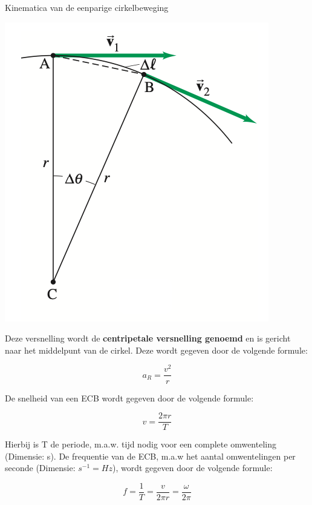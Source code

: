 \begin{theo}{Kinematica van de eenparige cirkelbeweging}
\begin{minipage}{.55\textwidth}
        
    \end{minipage} 
    \begin{minipage}{.41\textwidth}
            \centering
            \includegraphics[scale = 0.35]{Images/Dynamica/Kinematica van de Cirkelbeweging.png}
            
    \end{minipage}
    
    \noindent Deze versnelling wordt de \textbf{centripetale versnelling genoemd} en is gericht naar het middelpunt van de cirkel. Deze wordt gegeven door de volgende formule: 
    
        \begin{equation*}
            a_R = \dfrac{v^2}{r}
        \end{equation*}
        
    \noindent De snelheid van een ECB wordt gegeven door de volgende formule: 
    
    \begin{equation*}
        v = \dfrac{2\pi r}{T}
    \end{equation*}
    
    \noindent Hierbij is T de periode, m.a.w. tijd nodig voor een complete omwenteling (Dimensie: s). De frequentie van de ECB, m.a.w het aantal omwentelingen per seconde (Dimensie: $ s^{-1} = Hz $), wordt gegeven door de volgende formule:
    
    \begin{equation*}
        f = \dfrac{1}{T} = \dfrac{v}{2\pi r} = \dfrac{\omega}{2\pi}
    \end{equation*}
\end{theo}

